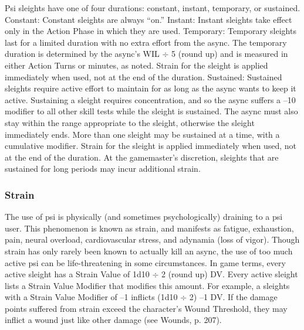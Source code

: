 Psi sleights have one of four durations: constant, instant, temporary, or sustained. Constant: Constant sleights are always “on.” Instant: Instant sleights take effect only in the Action Phase in which they are used. Temporary: Temporary sleights last for a limited duration with no extra effort from the async. The temporary duration is determined by the async’s WIL $\div$ 5 (round up) and is measured in either Action Turns or minutes, as noted. Strain for the sleight is applied immediately when used, not at the end of the duration. Sustained: Sustained sleights require active effort to maintain for as long as the async wants to keep it active. Sustaining a sleight requires concentration, and so the async suffers a –10 modifier to all other skill tests while the sleight is sustained. The async must also stay within the range appropriate to the sleight, otherwise the sleight immediately ends. More than one sleight may be sustained at a time, with a cumulative modifier. Strain for the sleight is applied immediately when used, not at the end of the duration. At the gamemaster’s discretion, sleights that are sustained for long periods may incur additional strain. 

\subsubsection{Strain} 

The use of psi is physically (and sometimes psychologically) draining to a psi user. This phenomenon is known as strain, and manifests as fatigue, exhaustion, pain, neural overload, cardiovascular stress, and adynamia (loss of vigor). Though strain has only rarely been known to actually kill an async, the use of too much active psi can be life-threatening in some circumstances. In game terms, every active sleight has a Strain Value of 1d10 $\div$ 2 (round up) DV. Every active sleight lists a Strain Value Modifier that modifies this amount. For example, a sleights with a Strain Value Modifier of –1 inflicts (1d10 $\div$ 2) –1 DV. If the damage points suffered from strain exceed the character’s Wound Threshold, they may inflict a wound just like other damage (see Wounds, p. 207). 

